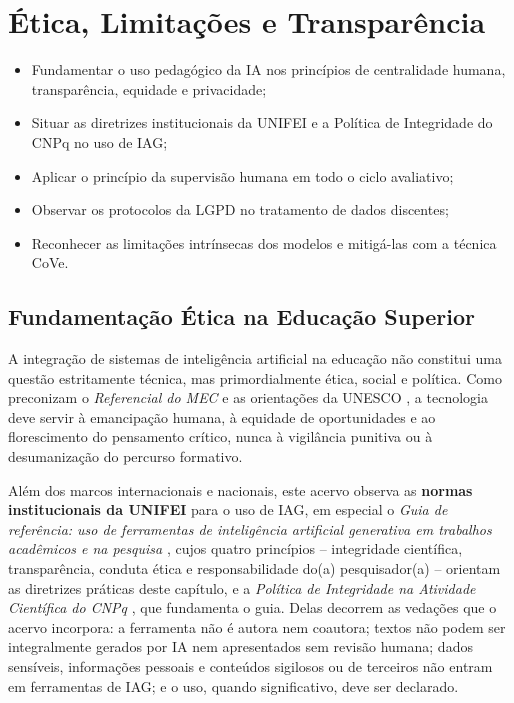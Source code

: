 \chapter{{\'E}tica, Limita{\c c}{\~o}es e Transpar{\^e}ncia}
\label{cap:etica-transparencia}

\begin{objetivos}
\begin{itemize}
  \item Fundamentar o uso pedag{\'o}gico da IA nos princ{\'i}pios de centralidade humana, transpar{\^e}ncia, equidade e privacidade;
  \item Situar as diretrizes institucionais da UNIFEI e a Pol{\'i}tica de Integridade do CNPq no uso de IAG;
  \item Aplicar o princ{\'i}pio da supervis{\~a}o humana em todo o ciclo avaliativo;
  \item Observar os protocolos da LGPD no tratamento de dados discentes;
  \item Reconhecer as limita{\c c}{\~o}es intr{\'i}nsecas dos modelos e mitig{\'a}-las com a t{\'e}cnica CoVe.
\end{itemize}
\end{objetivos}

\section{Fundamenta{\c c}{\~a}o {\'E}tica na Educa{\c c}{\~a}o Superior}

A integra{\c c}{\~a}o de sistemas de intelig{\^e}ncia artificial na educa{\c c}{\~a}o n{\~a}o constitui uma quest{\~a}o estritamente t{\'e}cnica, mas primordialmente {\'e}tica, social e pol{\'i}tica. Como preconizam o \emph{Referencial do MEC} \cite{brasil2026referencial} e as orienta{\c c}{\~o}es da UNESCO \cite{unesco2021guidance}, a tecnologia deve servir {\`a} emancipa{\c c}{\~a}o humana, {\`a} equidade de oportunidades e ao florescimento do pensamento cr{\'i}tico, nunca {\`a} vigil{\^a}ncia punitiva ou {\`a} desumaniza{\c c}{\~a}o do percurso formativo.

Al{\'e}m dos marcos internacionais e nacionais, este acervo observa as \textbf{normas institucionais da UNIFEI} para o uso de IAG, em especial o \emph{Guia de refer{\^e}ncia: uso de ferramentas de intelig{\^e}ncia artificial generativa em trabalhos acad{\^e}micos e na pesquisa} \cite{unifei2026guia}, cujos quatro princ{\'i}pios -- integridade cient{\'i}fica, transpar{\^e}ncia, conduta {\'e}tica e responsabilidade do(a) pesquisador(a) -- orientam as diretrizes pr{\'a}ticas deste cap{\'i}tulo, e a \emph{Pol{\'i}tica de Integridade na Atividade Cient{\'i}fica do CNPq} \cite{cnpq2026integridade}, que fundamenta o guia. Delas decorrem as veda{\c c}{\~o}es que o acervo incorpora: a ferramenta n{\~a}o {\'e} autora nem coautora; textos n{\~a}o podem ser integralmente gerados por IA nem apresentados sem revis{\~a}o humana; dados sens{\'i}veis, informa{\c c}{\~o}es pessoais e conte{\'u}dos sigilosos ou de terceiros n{\~a}o entram em ferramentas de IAG; e o uso, quando significativo, deve ser declarado.

